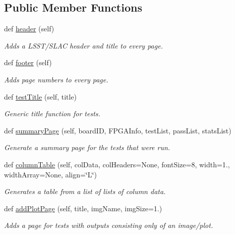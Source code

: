 \subsection*{Public Member Functions}
\begin{DoxyCompactItemize}
\item 
def \hyperlink{class_w_r_e_b_test_p_d_f_gen_1_1_p_d_f_a4b6b6d94d233f78619d1bf5f4e073262}{header} (self)
\begin{DoxyCompactList}\small\item\em Adds a L\+S\+S\+T/\+S\+L\+AC header and title to every page. \end{DoxyCompactList}\item 
def \hyperlink{class_w_r_e_b_test_p_d_f_gen_1_1_p_d_f_ac6a8fd44a385c902d31d7c9d16e03e90}{footer} (self)
\begin{DoxyCompactList}\small\item\em Adds page numbers to every page. \end{DoxyCompactList}\item 
def \hyperlink{class_w_r_e_b_test_p_d_f_gen_1_1_p_d_f_af24a351f586746189ef5dcb43befbdd3}{test\+Title} (self, title)
\begin{DoxyCompactList}\small\item\em Generic title function for tests. \end{DoxyCompactList}\item 
def \hyperlink{class_w_r_e_b_test_p_d_f_gen_1_1_p_d_f_a01344dd1c40787195f6a69b9f851146d}{summary\+Page} (self, board\+ID, F\+P\+G\+A\+Info, test\+List, pass\+List, stats\+List)
\begin{DoxyCompactList}\small\item\em Generate a summary page for the tests that were run. \end{DoxyCompactList}\item 
def \hyperlink{class_w_r_e_b_test_p_d_f_gen_1_1_p_d_f_a3b70bba53caab82b44116b06545e2907}{column\+Table} (self, col\+Data, col\+Headers=None, font\+Size=8, width=1., width\+Array=None, align=\char`\"{}L\char`\"{})
\begin{DoxyCompactList}\small\item\em Generates a table from a list of lists of column data. \end{DoxyCompactList}\item 
def \hyperlink{class_w_r_e_b_test_p_d_f_gen_1_1_p_d_f_a38dad738ede8deafb3f9d2c2af02623b}{add\+Plot\+Page} (self, title, img\+Name, img\+Size=1.)
\begin{DoxyCompactList}\small\item\em Adds a page for tests with outputs consisting only of an image/plot. \end{DoxyCompactList}\item 

\end{DoxyCompactItemize}
